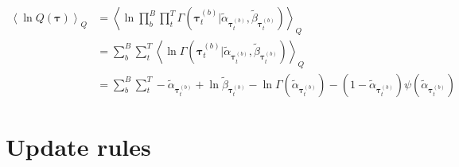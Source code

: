 \documentclass[10pt]{article}
\newcommand{\Angle}[1]{\left \langle #1 \right \rangle}
\newcommand{\Eq}[1]{\Angle{#1}_Q}
\begin{document}
    \begin{align}
        \Eq{\ln{Q(\bm{\tau})}}&=\Eq{\ln{\prod_b^B\prod_t^T\Gamma(\bm{\tau}_t^{(b)}|\tilde{\alpha}_{\bm{\tau}_t^{(b)}}, \tilde{\beta}_{\bm{\tau}_t^{(b)}})}} \nonumber \\
        &=\sum_b^B\sum_t^T\Eq{\ln{\Gamma(\bm{\tau}_t^{(b)}|\tilde{\alpha}_{\bm{\tau}_t^{(b)}}, \tilde{\beta}_{\bm{\tau}_t^{(b)}})}} \nonumber \\
        &=\sum_b^B\sum_t^T -\tilde{\alpha}_{\bm{\tau}_t^{(b)}}+ \ln{\tilde{\beta}_{\bm{\tau}_t^{(b)}}} - \ln{\Gamma(\tilde{\alpha}_{\bm{\tau}_t^{(b)}})} - (1 - \tilde{\alpha}_{\bm{\tau}_t^{(b)}}) \psi(\tilde{\alpha}_{\bm{\tau}_t^{(b)}})
        \label{qtau}
    \end{align}

\section{Update rules}
\end{document}
